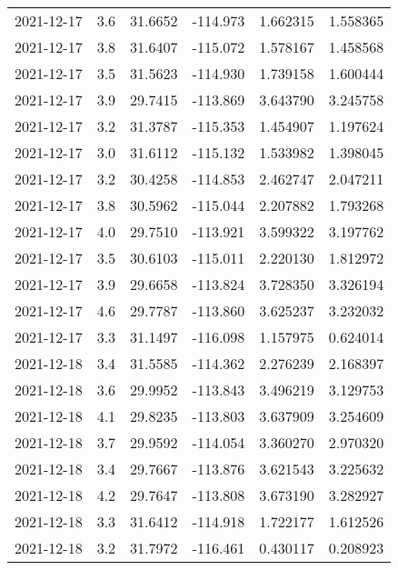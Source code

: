 \begin{tabular}{lrrrrr}
2021-12-17 &       3.6 &  31.6652 &  -114.973 &         1.662315 &         1.558365 \\
2021-12-17 &       3.8 &  31.6407 &  -115.072 &         1.578167 &         1.458568 \\
2021-12-17 &       3.5 &  31.5623 &  -114.930 &         1.739158 &         1.600444 \\
2021-12-17 &       3.9 &  29.7415 &  -113.869 &         3.643790 &         3.245758 \\
2021-12-17 &       3.2 &  31.3787 &  -115.353 &         1.454907 &         1.197624 \\
2021-12-17 &       3.0 &  31.6112 &  -115.132 &         1.533982 &         1.398045 \\
2021-12-17 &       3.2 &  30.4258 &  -114.853 &         2.462747 &         2.047211 \\
2021-12-17 &       3.8 &  30.5962 &  -115.044 &         2.207882 &         1.793268 \\
2021-12-17 &       4.0 &  29.7510 &  -113.921 &         3.599322 &         3.197762 \\
2021-12-17 &       3.5 &  30.6103 &  -115.011 &         2.220130 &         1.812972 \\
2021-12-17 &       3.9 &  29.6658 &  -113.824 &         3.728350 &         3.326194 \\
2021-12-17 &       4.6 &  29.7787 &  -113.860 &         3.625237 &         3.232032 \\
2021-12-17 &       3.3 &  31.1497 &  -116.098 &         1.157975 &         0.624014 \\
2021-12-18 &       3.4 &  31.5585 &  -114.362 &         2.276239 &         2.168397 \\
2021-12-18 &       3.6 &  29.9952 &  -113.843 &         3.496219 &         3.129753 \\
2021-12-18 &       4.1 &  29.8235 &  -113.803 &         3.637909 &         3.254609 \\
2021-12-18 &       3.7 &  29.9592 &  -114.054 &         3.360270 &         2.970320 \\
2021-12-18 &       3.4 &  29.7667 &  -113.876 &         3.621543 &         3.225632 \\
2021-12-18 &       4.2 &  29.7647 &  -113.808 &         3.673190 &         3.282927 \\
2021-12-18 &       3.3 &  31.6412 &  -114.918 &         1.722177 &         1.612526 \\
2021-12-18 &       3.2 &  31.7972 &  -116.461 &         0.430117 &         0.208923 \\

\end{tabular}

